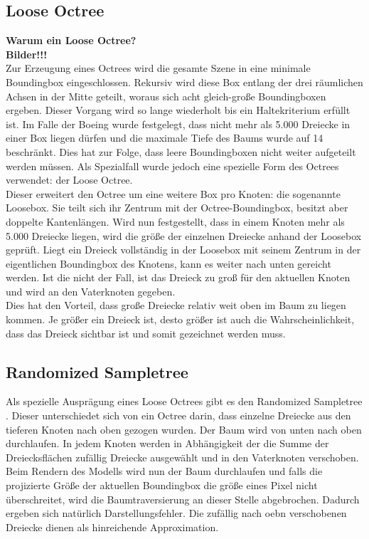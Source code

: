 \subsection{Loose Octree}
\label{sec:basics:octree}
\textbf{Warum ein Loose Octree?}\\
\textbf{Bilder!!!}\\
Zur Erzeugung eines Octrees \cite{RTR3} wird die gesamte Szene in eine minimale Boundingbox eingeschlossen. Rekursiv wird diese Box entlang der drei räumlichen Achsen in der Mitte geteilt, woraus sich acht gleich-große Boundingboxen ergeben. Dieser Vorgang wird so lange wiederholt bis ein Haltekriterium erfüllt ist. Im Falle der Boeing wurde festgelegt, dass nicht mehr als 5.000 Dreiecke in einer Box liegen dürfen und die maximale Tiefe des Baums wurde auf 14 beschränkt. Dies hat zur Folge, dass leere Boundingboxen nicht weiter aufgeteilt werden müssen. Als Spezialfall wurde jedoch eine spezielle Form des Octrees verwendet: der Loose Octree.\\
Dieser erweitert den Octree um eine weitere Box pro Knoten: die sogenannte Loosebox. Sie teilt sich ihr Zentrum mit der Octree-Boundingbox, besitzt aber doppelte Kantenlängen. Wird nun festgestellt, dass in einem Knoten mehr als 5.000 Dreiecke liegen, wird die größe der einzelnen Dreiecke anhand der Loosebox geprüft. Liegt ein Dreieck vollständig in der Loosebox mit seinem Zentrum in der eigentlichen Boundingbox des Knotens, kann es weiter nach unten gereicht werden. Ist die nicht der Fall, ist das Dreieck zu groß für den aktuellen Knoten und wird an den Vaterknoten gegeben.\\
Dies hat den Vorteil, dass große Dreiecke relativ weit oben im Baum zu liegen kommen. Je größer ein Dreieck ist, desto größer ist auch die Wahrscheinlichkeit, dass das Dreieck sichtbar ist und somit gezeichnet werden muss.
\subsection{Randomized Sampletree}
\label{sec:basics:sampletree}
Als spezielle Ausprägung eines Loose Octrees gibt es den Randomized Sampletree \cite{klein}. Dieser unterschiedet sich von ein Octree darin, dass einzelne Dreiecke aus den tieferen Knoten nach oben gezogen wurden. Der Baum wird von unten nach oben durchlaufen. In jedem Knoten werden in Abhängigkeit der die Summe der Dreiecksflächen zufällig Dreiecke ausgewählt und in den Vaterknoten verschoben. Beim Rendern des Modells wird nun der Baum durchlaufen und falls die projizierte Größe der aktuellen Boundingbox die größe eines Pixel nicht überschreitet, wird die Baumtraversierung an dieser Stelle abgebrochen. Dadurch ergeben sich natürlich Darstellungsfehler. Die zufällig nach oebn verschobenen Dreiecke dienen als hinreichende Approximation.


